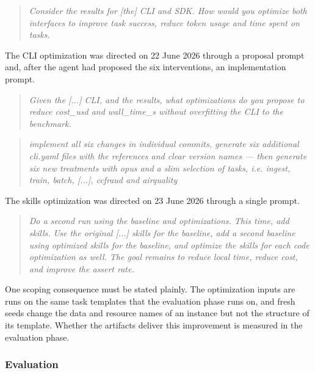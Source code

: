\documentclass[
english,                 %
bibtex,                  %
]{kththesis}
\numberwithin{listing}{chapter}
\begin{document}
\begin{quote}
\emph{Consider the results for [the] \gls{CLI} and \gls{SDK}. How would you optimize both interfaces to improve task success, reduce token usage and time spent on tasks.}
\end{quote}

The \gls{CLI} optimization was directed on 22 June 2026 through a proposal prompt and, after the agent had proposed the six interventions, an implementation prompt.

\begin{quote}
\emph{Given the [...] \gls{CLI}, and the results, what optimizations do you propose to reduce cost\_usd and wall\_time\_s without overfitting the \gls{CLI} to the benchmark.}
\end{quote}

\begin{quote}
\emph{implement all six changes in individual commits, generate six additional cli.yaml files with the references and clear version names --- then generate six new treatments with opus and a slim selection of tasks, i.e. ingest, train, batch, [...], ccfraud and airquality}
\end{quote}

The skills optimization was directed on 23 June 2026 through a single prompt.

\begin{quote}
\emph{Do a second run using the baseline and optimizations. This time, add skills. Use the original [...] skills for the baseline, add a second baseline using optimized skills for the baseline, and optimize the skills for each code optimization as well. The goal remains to reduce local time, reduce cost, and improve the assert rate.}
\end{quote}

One scoping consequence must be stated plainly. The optimization inputs are runs on the same task templates that the evaluation phase runs on, and fresh seeds change the data and resource names of an instance but not the structure of its template. Whether the artifacts deliver this improvement is measured in the evaluation phase.

\subsubsection{Evaluation}
\label{sec:method_evaluation}
\end{document}
